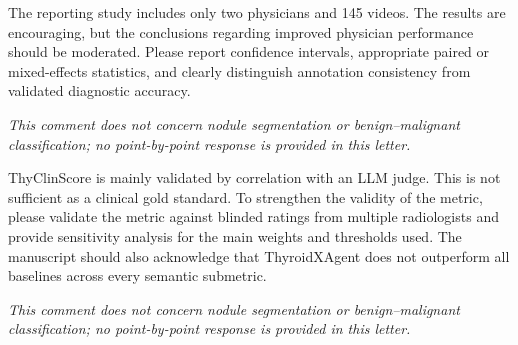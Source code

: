 \begin{reviewercomment}
The reporting study includes only two physicians and 145 videos. The results are encouraging, but the conclusions regarding improved physician performance should be moderated. Please report confidence intervals, appropriate paired or mixed-effects statistics, and clearly distinguish annotation consistency from validated diagnostic accuracy.
\end{reviewercomment}
\begin{authorresponse}
\noindent\textit{This comment does not concern nodule segmentation or benign--malignant classification; no point-by-point response is provided in this letter.}
\end{authorresponse}

\begin{reviewercomment}
ThyClinScore is mainly validated by correlation with an LLM judge. This is not sufficient as a clinical gold standard. To strengthen the validity of the metric, please validate the metric against blinded ratings from multiple radiologists and provide sensitivity analysis for the main weights and thresholds used. The manuscript should also acknowledge that ThyroidXAgent does not outperform all baselines across every semantic submetric.
\end{reviewercomment}
\begin{authorresponse}
\noindent\textit{This comment does not concern nodule segmentation or benign--malignant classification; no point-by-point response is provided in this letter.}
\end{authorresponse}

